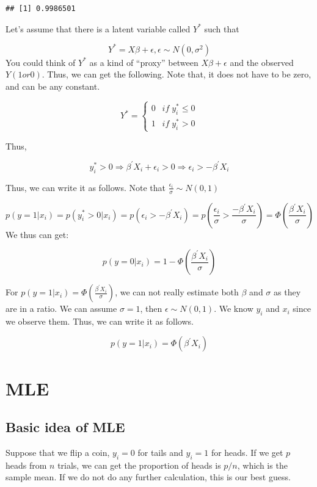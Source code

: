 \documentclass[
]{book}
\begin{document}
\begin{verbatim}
## [1] 0.9986501
\end{verbatim}

Let's assume that there is a latent variable called \(Y^*\) such that

\[Y^*=X\beta+\epsilon, \epsilon \sim N(0,\sigma^2)\]
You could think of \(Y^*\) as a kind of ``proxy'' between \(X\beta+\epsilon\) and the observed \(Y (1 or 0)\). Thus, we can get the following. Note that, it does not have to be zero, and can be any constant.

\[
Y^*=\begin{cases} 0 \;\;\: if \;  y_i^* \leq 0 \\ 1 \;\;\: if \;  y_i^* > 0 \end{cases}
\]

Thus,

\[y_i^* > 0 \Rightarrow \beta^{'}X_i + \epsilon_i >0 \Rightarrow \epsilon_i > -\beta^{'}X_i\]

Thus, we can write it as follows. Note that \(\frac{ \epsilon_i}{\sigma} \sim N(0,1)\)

\[p(y=1|x_i)= p(y_i^* >0|x_i)=p(\epsilon_i > -\beta^{'}X_i)= p(\frac{ \epsilon_i}{\sigma}>\frac{-\beta^{'}X_i}{\sigma})=\Phi(\frac{\beta^{'}X_i}{\sigma}) \]
We thus can get:

\[p(y=0|x_i)=1-\Phi(\frac{\beta^{'}X_i}{\sigma})\]

For \(p(y=1|x_i)=\Phi(\frac{\beta^{'}X_i}{\sigma})\), we can not really estimate both \(\beta\) and \(\sigma\) as they are in a ratio. We can assume \(\sigma =1\), then \(\epsilon \sim N(0,1)\).
We know \(y_i\) and \(x_i\) since we observe them. Thus, we can write it as follows.

\[p(y=1|x_i)=\Phi(\beta^{'}X_i)\]

\hypertarget{intro}{%
\chapter{MLE}\label{intro}}

\hypertarget{basic-idea-of-mle}{%
\section{Basic idea of MLE}\label{basic-idea-of-mle}}

Suppose that we flip a coin, \(y_i=0\) for tails and \(y_i=1\) for heads. If we get \(p\) heads from \(n\) trials, we can get the proportion of heads is \(p/n\), which is the sample mean. If we do not do any further calculation, this is our best guess.
\end{document}
